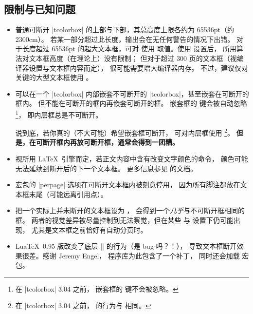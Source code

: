 \subsection{限制与已知问题}
\begin{itemize}
\item 普通可断开 |tcolorbox| 的上部与下部，其总高度上限各约为 65536pt（约 2300cm）。
  若某一部分超过此长度，输出会在无任何警告的情况下出错。
  对于长度超过 65536pt 的超大文本框，可对  使用
   取值。使用  设置后，
  所用算法对文本框高度（在理论上）没有限制；
  但对于超过 300 页的文本框（视编译器设置与文本框内容而定），
  很可能需要增大编译器内存。
  不过，建议仅对关键的大型文本框使用 。
\item 可以在一个 |tcolorbox| 内部嵌套不可断开的 |tcolorbox|，甚至嵌套在可断开的框内。
  但不能在可断开的框内再嵌套可断开的框。
  嵌套框的  键会被自动忽略\footnote{在 |tcolorbox| 3.04 之前，
  嵌套框的  键不会被忽略。}，
  即内层框总是不可断开。\par
  说到底，若你真的（不大可能）希望嵌套框可断开，
  可对内层框使用 \footnote{在 |tcolorbox| 3.04 之前，
   的行为与  相同。}。
  \textbf{但是，在可断开框内再放可断开框，通常会得到一团糟。}
\item{}
  视所用 \LaTeX\ 引擎而定，若正文内容中含有改变文字颜色的命令，
  颜色可能无法延续到断开后的下一个文本框。
  更多信息参见  的文档。
\item{}
   宏包的 |perpage| 选项在可断开文本框内被刻意停用，
  因为所有脚注都放在文本框末尾（可能远离引用点）。
\item{}
  把一个实际上并未断开的文本框设为 ，
  会得到一个\emph{几乎}与不可断开框相同的框。
  两者的视觉差异被尽量控制到无法察觉，但在某些
   与  设置下仍可能出现，
  尤其是文本框之前恰好有自动分页时。
\item{}
  Lua\TeX\ 0.95 版改变了底层 |\vsplit| 的行为（是 bug 吗？！），
  导致文本框断开效果很差。感谢 Jeremy Engel，
   程序库为此包含了一个补丁，
  同时还会加载  宏包。
\end{itemize}


